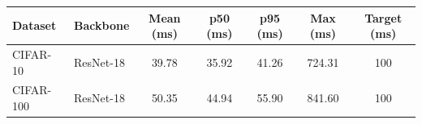 \begin{tabular}{llccccc}
\toprule
Dataset & Backbone & Mean (ms) & p50 (ms) & p95 (ms) & Max (ms) & Target (ms) \\
\midrule
CIFAR-10  & ResNet-18  & 39.78 & 35.92 & 41.26 & 724.31 & 100 \\
CIFAR-100 & ResNet-18  & 50.35 & 44.94 & 55.90 & 841.60 & 100 \\
\bottomrule
\end{tabular}
